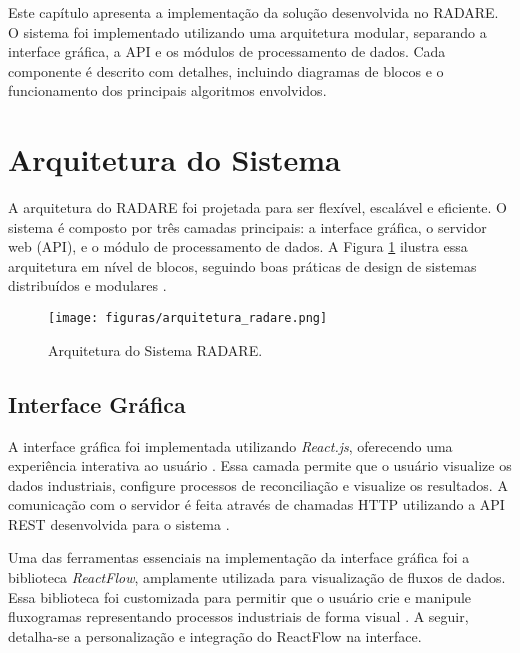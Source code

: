 \label{Cap:Implementacao}

Este capítulo apresenta a implementação da solução desenvolvida no RADARE. O sistema foi implementado utilizando uma arquitetura modular, separando a interface gráfica, a API e os módulos de processamento de dados. Cada componente é descrito com detalhes, incluindo diagramas de blocos e o funcionamento dos principais algoritmos envolvidos.

\section{Arquitetura do Sistema}
\label{Sec:ArquiteturaSistema}

A arquitetura do RADARE foi projetada para ser flexível, escalável e eficiente. O sistema é composto por três camadas principais: a interface gráfica, o servidor web (API), e o módulo de processamento de dados. A Figura \ref{Fig:Arquitetura} ilustra essa arquitetura em nível de blocos, seguindo boas práticas de design de sistemas distribuídos e modulares \cite{modularsystems2024}.

\begin{figure}[htbp]
    \centering
    \texttt{[image: figuras/arquitetura\_radare.png]}
    \caption{Arquitetura do Sistema RADARE.}
    \label{Fig:Arquitetura}
\end{figure}

\subsection{Interface Gráfica}
\label{Sec:InterfaceGrafica}

A interface gráfica foi implementada utilizando \textit{React.js}, oferecendo uma experiência interativa ao usuário \cite{reactjs2024}. Essa camada permite que o usuário visualize os dados industriais, configure processos de reconciliação e visualize os resultados. A comunicação com o servidor é feita através de chamadas HTTP utilizando a API REST desenvolvida para o sistema \cite{restapi2024}.

Uma das ferramentas essenciais na implementação da interface gráfica foi a biblioteca \textit{ReactFlow}, amplamente utilizada para visualização de fluxos de dados. Essa biblioteca foi customizada para permitir que o usuário crie e manipule fluxogramas representando processos industriais de forma visual \cite{reactflow2023}. A seguir, detalha-se a personalização e integração do ReactFlow na interface.

